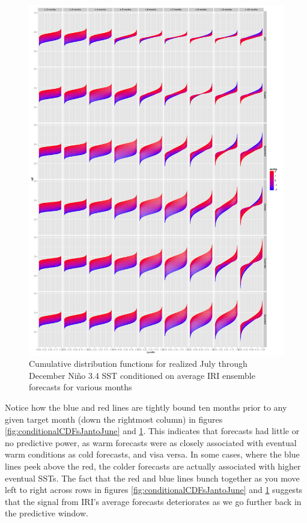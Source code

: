 \documentclass[authoryear]{article}
\begin{document}
\begin{figure}[!htbp]
  \includegraphics[width=\linewidth]{Pricingfigs/conditionalCDFsJultoDec}
    \caption{Cumulative distribution functions for realized July through December Ni\~no 3.4 SST conditioned on average IRI ensemble forecasts for various months}
   \label{fig:conditionalCDFsJultoDec}
\end{figure}

Notice how the blue and red lines are tightly bound ten months prior to any given target month (down the rightmost column) in figures \ref{fig:conditionalCDFsJantoJune} and \ref{fig:conditionalCDFsJultoDec}. This indicates that forecasts had little or no predictive power, as warm forecasts were as closely associated with eventual warm conditions as cold forecasts, and visa versa. In some cases, where the blue lines peek above the red, the colder forecasts are actually associated with higher eventual SSTs. The fact that the red and blue lines bunch together as you move left to right across rows in figures \ref{fig:conditionalCDFsJantoJune} and \ref{fig:conditionalCDFsJultoDec} suggests that the signal from IRI's average forecasts deteriorates as we go further back in the predictive window.
\end{document}
